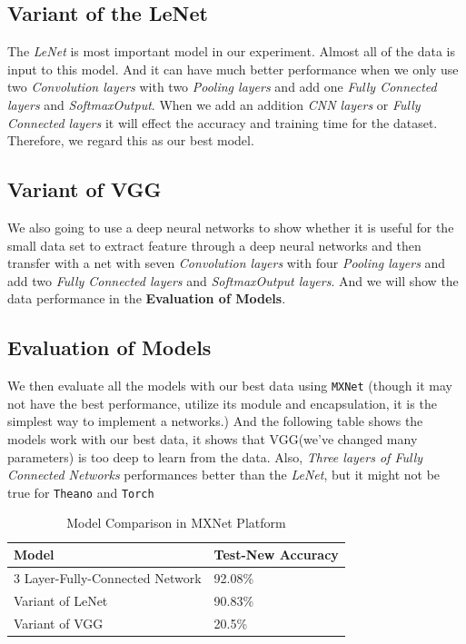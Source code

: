 \documentclass[12pt]{article}
\begin{document}
\subsection{Variant of the LeNet}
The {\it LeNet} is most important model in our experiment. Almost all of the data is input to this model.
And it can have much better performance when we only use two {\it Convolution layers} with two {\it Pooling layers} and add one {\it Fully Connected layers} and {\it SoftmaxOutput}. When we add an addition {\it CNN layers} or {\it Fully Connected layers} it will effect the accuracy and training time for the  dataset. Therefore, we regard this as our best model.

\subsection{Variant of VGG}
We also going to use a deep neural networks to show whether it is useful for the small data set to extract feature through a deep neural networks and then transfer with a net with seven {\it Convolution layers} with four {\it Pooling layers} and add two {\it Fully Connected layers} and {\it SoftmaxOutput layers}. And we will show the data performance in the {\bf Evaluation of Models}.

\subsection{Evaluation of Models}

We then evaluate all the models with our best data using \texttt{MXNet} (though it may not have the best performance, utilize its module and encapsulation, it is the simplest way to implement a networks.)
And the following table shows the models work with our best data, it shows that VGG(we've changed many parameters) is too deep to learn from the data. Also, {\it Three layers of Fully Connected Networks} performances better than the {\it LeNet}, but it might not be true for \texttt{Theano} and \texttt{Torch}

\begin{table}[!htbp]
	\caption {Model Comparison in MXNet Platform} \label{tab:title} 
	\begin{center}
		\begin{tabular}{|l|l|}
			\hline
			Model & Test-New Accuracy \\
			\hline
			3 Layer-Fully-Connected Network & 92.08\% \\
			\hline
			Variant of LeNet & 90.83\% \\
			\hline
			Variant of VGG & 20.5\% \\
			\hline
		\end{tabular}
	\end{center}
\end{table} 
\end{document}
